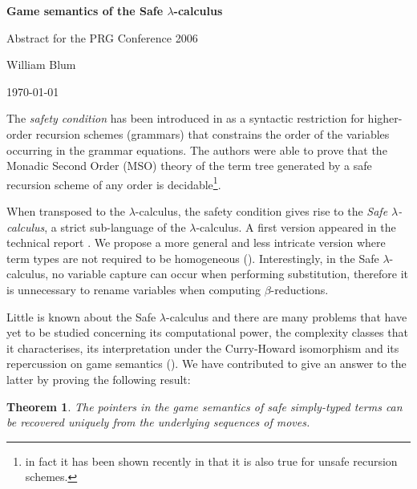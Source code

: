 \documentclass[12pt]{article}
\newtheorem{thm}{Theorem}
\begin{document}
\begin{center}
{\Large \bf Game semantics of the Safe $\lambda$-calculus}
\vspace{0.2cm}

{\small Abstract for the PRG Conference 2006} \vspace{0.4cm}

William Blum \vspace{0.4cm}

\today \vspace{0.5cm}
\end{center}


The \emph{safety condition} has been introduced in \cite{KNU02} as a
syntactic restriction for higher-order recursion schemes (grammars)
that constrains the order of the variables occurring in the grammar
equations. The authors were able to prove that the Monadic Second
Order (MSO) theory of the term tree generated by a safe recursion
scheme of any order is decidable\footnote{in fact it has been shown
recently in \cite{OngLics2006} that it is also true for unsafe
recursion schemes.}.

When transposed to the $\lambda$-calculus, the safety condition
gives rise to the \emph{Safe $\lambda$-calculus}, a strict
sub-language of the $\lambda$-calculus. A first version appeared in
the technical report \cite{safety-mirlong2004}. We propose a more
general and less intricate version where term types are not required
to be homogeneous (\cite{blumtransfer}). Interestingly, in the Safe
$\lambda$-calculus, no variable capture can occur when performing
substitution, therefore it is unnecessary to rename variables when
computing $\beta$-reductions.

Little is known about the Safe $\lambda$-calculus and there are many
 problems that have yet to be studied concerning its
computational power, the complexity classes that it characterises,
its interpretation under the Curry-Howard isomorphism and its
repercussion on game semantics
(\cite{abramsky:game-semantics-tutorial}). We have contributed to
give an answer to the latter by proving the following result:
\begin{thm}
\label{thm:safeptrrecover} The pointers in the game semantics of
safe simply-typed terms can be recovered uniquely from the
underlying sequences of moves.
\end{thm}
\end{document}
